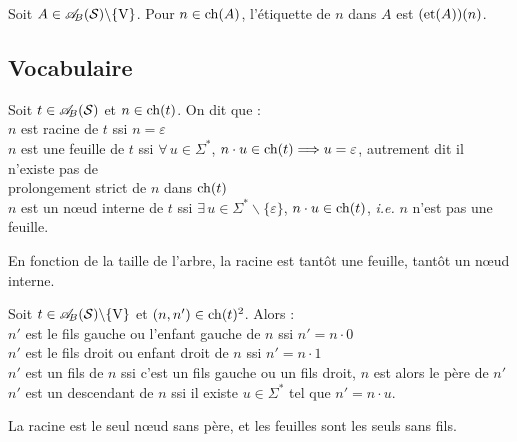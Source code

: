 		\begin{Definition}
			Soit \(A\in\mathscr{A}_{\!B}(\mathcal{S})\backslash\{\mathrm{V}\}\). Pour \(n\in\operatorname{ch}(A)\), l'étiquette de \(n\) dans \(A\) est \((\operatorname{et}(A))(n)\).
		\end{Definition}
		
	\subsection{Vocabulaire}
		
		\begin{Definition}
			Soit \(t\in\mathscr{A}_{\!B}(\mathcal{S})\) et \(n\in\operatorname{ch}(t)\). On dit que : \\
				 \bdot \(n\) est racine de \(t\) ssi \(n=\varepsilon\) \\
				 \bdot \(n\) est une feuille de \(t\) ssi \(\forall\,u\in\Sigma^*\), \(n\cdot u \in\operatorname{ch}(t) \Longrightarrow u = \varepsilon\), autrement dit il n'existe pas de \\  \listspace prolongement strict de \(n\) dans \(\operatorname{ch}(t)\) \\
				 \bdot \(n\) est un n\oe ud interne de \(t\) ssi \(\exists\,u\in\Sigma^*\backslash\{\varepsilon\}\), \(n\cdot u \in \operatorname{ch}(t)\), \emph{i.e.} \(n\) n'est pas une feuille.
		\end{Definition}
		
		\begin{Remarque}
			En fonction de la taille de l'arbre, la racine est tantôt une feuille, tantôt un n\oe ud interne.
		\end{Remarque}
	
		\begin{Definition}
			Soit \(t\in\mathscr{A}_{\!B}(\mathcal{S})\backslash\{\mathrm{V}\}\) et \((n,n')\in\operatorname{ch}(t)^2\). Alors : \\
				 \bdot \(n'\) est le fils gauche ou l'enfant gauche de \(n\) ssi \(n' = n\cdot 0\) \\
				 \bdot \(n'\) est le fils droit ou enfant droit de \(n\) ssi \(n' = n\cdot 1\) \\
				 \bdot \(n'\) est un fils de \(n\) ssi c'est un fils gauche ou un fils droit, \(n\) est alors le père de \(n'\) \\
				 \bdot \(n'\) est un descendant de \(n\) ssi il existe \(u\in\Sigma^*\) tel que \(n'=n\cdot u\).
		\end{Definition}
		
		\begin{Remarque}
			La racine est le seul n\oe ud sans père, et les feuilles sont les seuls sans fils.
		\end{Remarque}
		
